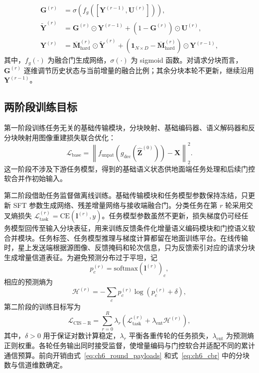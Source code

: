 \begin{equation}\label{eq:ch6_accum}
\begin{aligned}
\mathbf G^{(r)}&=\sigma\!\left(f_g\!\left([\mathbf Y^{(r-1)},\mathbf U^{(r)}]\right)\right),\\
\tilde{\mathbf Y}^{(r)}&=\mathbf G^{(r)}\odot\mathbf Y^{(r-1)}+\left(1-\mathbf G^{(r)}\right)\odot\mathbf U^{(r)},\\
\mathbf Y^{(r)}&=\bar{\mathbf M}_{\mathrm{hard}}^{(r)}\odot\tilde{\mathbf Y}^{(r)}
+\left(\mathbf 1_{N\times D}-\bar{\mathbf M}_{\mathrm{hard}}^{(r)}\right)\odot\mathbf Y^{(r-1)},
\end{aligned}
\end{equation}
其中，$f_g(\cdot)$ 为融合门生成网络，$\sigma(\cdot)$ 为 sigmoid 函数。对请求分块而言，$\mathbf G^{(r)}$ 逐维调节历史状态与当前增量的融合比例；其余分块本轮不更新，继续沿用 $\mathbf Y^{(r-1)}$。

\subsection{两阶段训练目标}
\label{subsec:ch6_train}

第一阶段训练任务无关的基础传输模块，分块映射、基础编码器、语义解码器和反分块映射用图像重建损失联合优化：
\begin{equation}\label{eq:ch6_base_loss}
\mathcal L_{\mathrm{base}}
=\left\|f_{\mathrm{unpat}}\!\left(g_{\mathrm{dec}}(\hat{\mathbf Z}^{(0)})\right)-\mathbf X\right\|_2^2.
\end{equation}
这一阶段不涉及下游任务模型，得到的基础语义状态供地面端任务处理和后续门控软合并作初始输入。

第二阶段借助任务监督做离线训练。基础传输模块和任务模型参数保持冻结，只更新 SFT 参数生成网络、残差增量网络与接收端融合门。分类任务在第 $r$ 轮采用交叉熵损失 $\mathcal L_{\mathrm{task}}^{(r)}=\mathrm{CE}(\mathbf l^{(r)},y)$。任务模型参数虽然不更新，损失梯度仍可经任务模型回传至输入分块表征，用来训练反馈条件化增量语义编码模块和门控语义软合并模块。任务标签、任务模型推理与梯度计算都留在地面训练平台。在线传输时，星上发送端根据源图像、反馈掩码和轮次信息，只为反馈索引对应的请求分块生成增量信道表征。为避免预测分布过于平坦，记
\begin{equation}
p_c^{(r)}=\mathrm{softmax}(\mathbf l^{(r)})_c,
\end{equation}
相应的预测熵为
\begin{equation}\label{eq:ch6_entropy}
\mathcal H^{(r)}=-\sum_c p_c^{(r)}\log\!\left(p_c^{(r)}+\delta\right),
\end{equation}
第二阶段的训练目标写为
\begin{equation}\label{eq:ch6_loss}
\mathcal L_{\mathrm{CIS-R}}
=\sum_{r=0}^{R}\lambda_r\left(\mathcal L_{\mathrm{task}}^{(r)}+\lambda_{\mathrm{ent}}\mathcal H^{(r)}\right),
\end{equation}
其中，$\delta>0$ 用于保证对数计算稳定，$\lambda_r$ 平衡各重传轮的任务损失，$\lambda_{\mathrm{ent}}$ 为预测熵正则权重。各轮任务输出同时接受监督，使增量编码与门控软合并适配不同的累计通信预算。前向开销由式~\eqref{eq:ch6_round_payloads} 和式~\eqref{eq:ch6_cbr} 中的分块数与信道维数确定。

